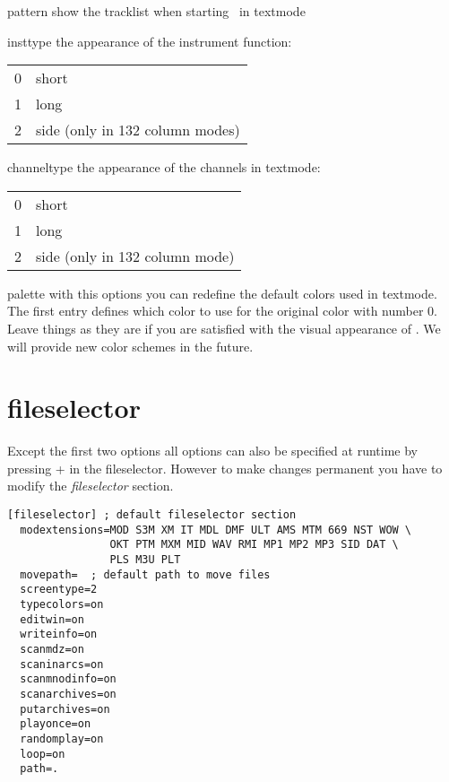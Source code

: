 \begin{dojlist}
\item[pattern] show the tracklist when starting \cp\ in textmode
\item[insttype] the appearance of the instrument function: \\
  \begin{tabular}{l@{ -- }l}
  0 & short \\
  1 & long \\
  2 & side (only in 132 column modes) \\
  \end{tabular}
\item[channeltype] the appearance of the channels in textmode: \\
  \begin{tabular}{l@{ -- }l}
  0 & short \\
  1 & long \\
  2 & side (only in 132 column mode) \\
  \end{tabular}
\item[palette] with this options you can redefine the default colors used in
textmode. The first entry defines which color to use for the original
color with number 0. Leave things as they are if you are satisfied
with the visual appearance of \cp. We will provide new color schemes
in the future.
\end{dojlist}

\section{fileselector}
Except the first two options all options can also be specified at
runtime by pressing + in the fileselector. However
to make changes permanent you have to modify the \emph{fileselector}
section.

\begin{verbatim}
[fileselector] ; default fileselector section
  modextensions=MOD S3M XM IT MDL DMF ULT AMS MTM 669 NST WOW \
                OKT PTM MXM MID WAV RMI MP1 MP2 MP3 SID DAT \
                PLS M3U PLT
  movepath=  ; default path to move files
  screentype=2
  typecolors=on
  editwin=on
  writeinfo=on
  scanmdz=on
  scaninarcs=on
  scanmnodinfo=on
  scanarchives=on
  putarchives=on
  playonce=on
  randomplay=on
  loop=on
  path=.
\end{verbatim}

